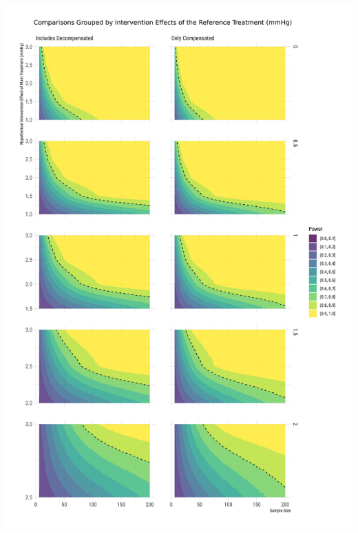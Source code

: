 \documentclass[
]{article}
\begin{document}
\includegraphics{figures/unnamed-chunk-77-1.png}
\end{document}
